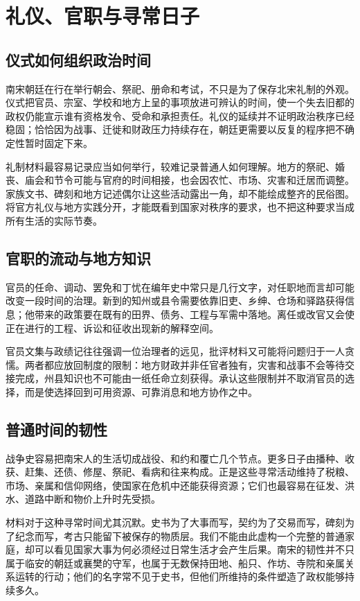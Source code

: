 \section{礼仪、官职与寻常日子}

\subsection{仪式如何组织政治时间}

南宋朝廷在行在举行朝会、祭祀、册命和考试，不只是为了保存北宋礼制的外观。仪式把官员、宗室、学校和地方上呈的事项放进可辨认的时间，使一个失去旧都的政权仍能宣示谁有资格发令、受命和承担责任。礼仪的延续并不证明政治秩序已经稳固；恰恰因为战事、迁徙和财政压力持续存在，朝廷更需要以反复的程序把不确定性暂时固定下来。

礼制材料最容易记录应当如何举行，较难记录普通人如何理解。地方的祭祀、婚丧、庙会和节令可能与官府的时间相接，也会因农忙、市场、灾害和迁居而调整。家族文书、碑刻和地方记述偶尔让这些活动露出一角，却不能绘成整齐的民俗图。将官方礼仪与地方实践分开，才能既看到国家对秩序的要求，也不把这种要求当成所有生活的实际节奏。

\subsection{官职的流动与地方知识}

官员的任命、调动、罢免和丁忧在编年史中常只是几行文字，对任职地而言却可能改变一段时间的治理。新到的知州或县令需要依靠旧吏、乡绅、仓场和驿路获得信息；他带来的政策要在既有的田界、债务、工程与军需中落地。离任或改官又会使正在进行的工程、诉讼和征收出现新的解释空间。

官员文集与政绩记往往强调一位治理者的远见，批评材料又可能将问题归于一人贪懦。两者都应放回制度的限制：地方财政并非任官者独有，灾害和战事不会等待交接完成，州县知识也不可能由一纸任命立刻获得。承认这些限制并不取消官员的选择，而是使选择回到可用资源、可靠消息和地方协作之中。

\subsection{普通时间的韧性}

战争史容易把南宋人的生活切成战役、和约和覆亡几个节点。更多日子由播种、收获、赶集、还债、修屋、祭祀、看病和往来构成。正是这些寻常活动维持了税粮、市场、亲属和信仰网络，使国家在危机中还能获得资源；它们也最容易在征发、洪水、道路中断和物价上升时先受损。

材料对于这种寻常时间尤其沉默。史书为了大事而写，契约为了交易而写，碑刻为了纪念而写，考古只能留下被保存的物质层。我们不能由此虚构一个完整的普通家庭，却可以看见国家大事为何必须经过日常生活才会产生后果。南宋的韧性并不只属于临安的朝廷或襄樊的守军，也属于无数保持田地、船只、作坊、寺院和亲属关系运转的行动；他们的名字常不见于史书，但他们所维持的条件塑造了政权能够持续多久。
